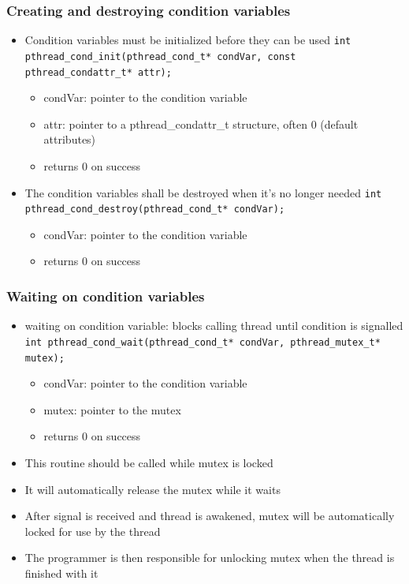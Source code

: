 \subsubsection{Creating and destroying condition variables}
\begin{itemize}
  \item Condition variables must be initialized before they can be used\newline
  \lstinline{int pthread_cond_init(pthread_cond_t* condVar, const pthread_condattr_t* attr);}
  \begin{itemize}
    \item condVar: pointer to the condition variable
    \item attr: pointer to a pthread\_condattr\_t structure, often 0 (default attributes)
    \item returns 0 on success
  \end{itemize}
  \item The condition variables shall be destroyed when it's no longer needed\newline
  \lstinline{int pthread_cond_destroy(pthread_cond_t* condVar);}
  \begin{itemize}
    \item condVar: pointer to the condition variable
    \item returns 0 on success
  \end{itemize}
\end{itemize}

\subsubsection{Waiting on condition variables}
\begin{itemize}
  \item waiting on condition variable: blocks calling thread until condition is signalled\newline
  \lstinline{int pthread_cond_wait(pthread_cond_t* condVar, pthread_mutex_t* mutex);}
  \begin{itemize}
    \item condVar: pointer to the condition variable
    \item mutex: pointer to the mutex
    \item returns 0 on success
  \end{itemize}
  \item This routine should be called while mutex is locked
  \item It will automatically release the mutex while it waits
  \item After signal is received and thread is awakened, mutex will be automatically locked for use by the thread
  \item The programmer is then responsible for unlocking mutex when the thread is finished with it
\end{itemize}

